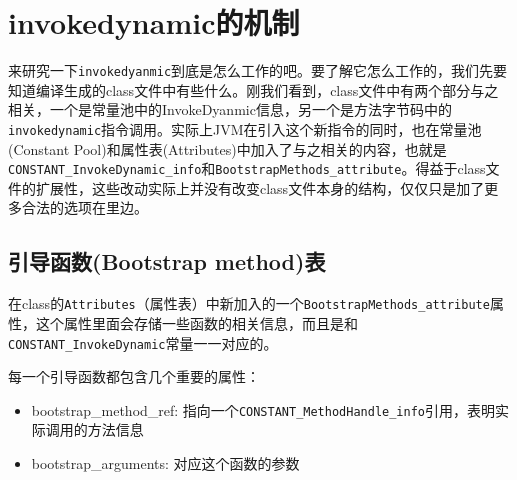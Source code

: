 \documentclass[12pt]{article}
\begin{document}
\section{invokedynamic的机制}\label{invokedynamicux7684ux673aux5236}

来研究一下\texttt{invokedyanmic}到底是怎么工作的吧。要了解它怎么工作的，我们先要知道编译生成的class文件中有些什么。刚我们看到，class文件中有两个部分与之相关，一个是常量池中的InvokeDyanmic信息，另一个是方法字节码中的\texttt{invokedynamic}指令调用。实际上JVM在引入这个新指令的同时，也在常量池(Constant Pool)和属性表(Attributes)中加入了与之相关的内容，也就是\texttt{CONSTANT\_InvokeDynamic\_info}和\texttt{BootstrapMethods\_attribute}。得益于class文件的扩展性，这些改动实际上并没有改变class文件本身的结构，仅仅只是加了更多合法的选项在里边。

\subsection{引导函数(Bootstrap method)表}\label{ux5f15ux5bfcux51fdux6570bootstrap-methodux8868}

在class的\texttt{Attributes}（属性表）中新加入的一个\texttt{BootstrapMethods\_attribute}属性，这个属性里面会存储一些函数的相关信息，而且是和\texttt{CONSTANT\_InvokeDynamic}常量一一对应的。

\begin{Shaded}
\begin{Highlighting}[]
\OperatorTok{\{}
\OperatorTok{;}
\OperatorTok{;}
\OperatorTok{;}
    \OperatorTok{\{}\OperatorTok{;}
\OperatorTok{;}
\OperatorTok{[}\OperatorTok{];}
    \OperatorTok{\}}\OperatorTok{[}\OperatorTok{];}
\OperatorTok{\}}
\end{Highlighting}
\end{Shaded}

每一个引导函数都包含几个重要的属性：

\begin{itemize}
\tightlist
\item
  bootstrap\_method\_ref: 指向一个\texttt{CONSTANT\_MethodHandle\_info}引用，表明实际调用的方法信息
\item
  bootstrap\_arguments: 对应这个函数的参数
\end{itemize}
\end{document}
